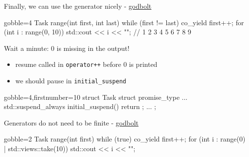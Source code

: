 \begin{frame}[fragile]
  \begin{exampleblock}{Finally, we can use the generator nicely - \href{https://godbolt.org/z/6bbrYrss5}{\color{blue!50}godbolt}}
    {\scriptsize
      \begin{cppcode*}{gobble=4}
        Task range(int first, int last) {
          while (first != last) {
            co_yield first++;
          }
        }
        for (int i : range(0, 10)) {
          std::cout << i << "";
        } // 1 2 3 4 5 6 7 8 9
      \end{cppcode*}
    }
  \end{exampleblock}
  \pause
  \begin{alertblock}{Wait a minute: 0 is missing in the output!}
    \begin{itemize}
    \item resume called in \texttt{operator++} before 0 is printed
    \item we should pause in \texttt{initial_suspend}
    \end{itemize}
     {\scriptsize
      \begin{cppcode*}{gobble=4,firstnumber=10}
        struct Task {
          struct promise_type {
            ...
            std::suspend_always initial_suspend() { return {}; }
            ...
          }
        };
      \end{cppcode*}
    }
  \end{alertblock}
\end{frame}

\begin{frame}[fragile]
  \begin{block}{Generators do not need to be finite - \href{https://godbolt.org/z/MP6qdGWYe}{\color{blue!50}godbolt}}
    \begin{cppcode*}{gobble=2}
      Task range(int first) {
        while (true) {
          co_yield first++;
        }
      }
      for (int i : range(0) | std::views::take(10)) {
        std::cout << i << "\n";
      }
    \end{cppcode*}
  \end{block}
\end{frame}

